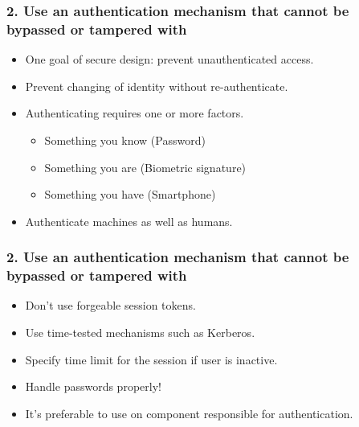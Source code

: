 \documentclass[12pt,norsk]{beamer}
\begin{document}
\begin{frame}

	\frametitle{2. Use an authentication mechanism that cannot be bypassed or tampered with}
	
	\begin{itemize}
		\item One goal of secure design: prevent unauthenticated access.
		\item Prevent changing of identity without re-authenticate.
		\item Authenticating requires one or more factors.
	
		\begin{itemize}
			\item Something you know (Password)
			\item Something you are (Biometric signature)
			\item Something you have (Smartphone)
		\end{itemize}
		
		\item Authenticate machines as well as humans.	
	
	\end{itemize}
	
	
\end{frame}

\begin{frame}

	\frametitle{2. Use an authentication mechanism that cannot be bypassed or tampered with}
	
	\begin{itemize}
		\item Don't use forgeable session tokens.
		\item Use time-tested mechanisms such as Kerberos\cite{kerberos}. 
		\item Specify time limit for the session if user is inactive.
		\item Handle passwords properly!
		\item It's preferable to use on component responsible for authentication.
	\end{itemize}
	
\end{frame}
\end{document}
